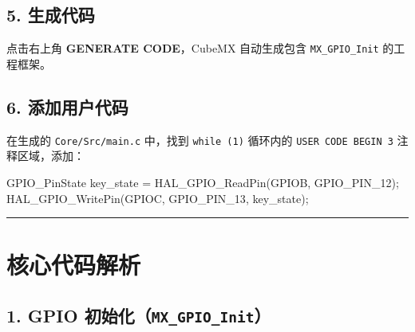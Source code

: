 \documentclass[
  chinese,
  UTF8,
  oneside,
  openany]{ctexbook}
\newenvironment{Shaded}{}{}
\newcommand{\NormalTok}[1]{#1}
\newcommand{\OperatorTok}[1]{\textcolor[rgb]{0.40,0.40,0.40}{#1}}
\begin{document}
\subsection{5. 生成代码}\label{ux751fux6210ux4ee3ux7801}

点击右上角 \textbf{GENERATE CODE}，CubeMX 自动生成包含
\texttt{MX\_GPIO\_Init} 的工程框架。

\subsection{6. 添加用户代码}\label{ux6dfbux52a0ux7528ux6237ux4ee3ux7801}

在生成的 \texttt{Core/Src/main.c} 中，找到 \texttt{while\ (1)} 循环内的
\texttt{USER\ CODE\ BEGIN\ 3} 注释区域，添加：

\begin{Shaded}
\begin{Highlighting}[]
\NormalTok{GPIO\_PinState key\_state }\OperatorTok{=}\NormalTok{ HAL\_GPIO\_ReadPin}\OperatorTok{(}\NormalTok{GPIOB}\OperatorTok{,}\NormalTok{ GPIO\_PIN\_12}\OperatorTok{);}
\NormalTok{HAL\_GPIO\_WritePin}\OperatorTok{(}\NormalTok{GPIOC}\OperatorTok{,}\NormalTok{ GPIO\_PIN\_13}\OperatorTok{,}\NormalTok{ key\_state}\OperatorTok{);}
\end{Highlighting}
\end{Shaded}

\begin{center}\rule{0.5\linewidth}{0.5pt}\end{center}

\section{核心代码解析}\label{ux6838ux5fc3ux4ee3ux7801ux89e3ux6790}

\subsection{\texorpdfstring{1. GPIO
初始化（\texttt{MX\_GPIO\_Init}）}{1. GPIO 初始化（MX\_GPIO\_Init）}}\label{gpio-ux521dux59cbux5316mx_gpio_init}
\end{document}
